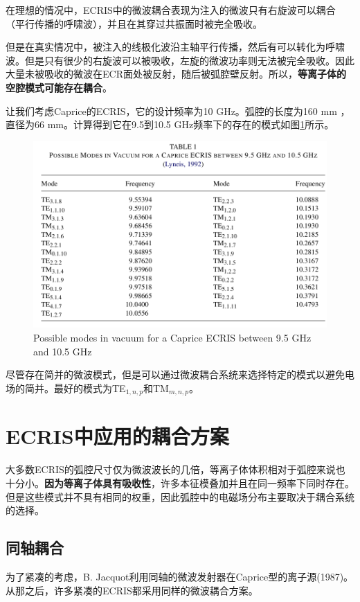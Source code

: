 \documentclass[fontset=windows]{article}
\begin{document}
在理想的情况中，ECRIS中的微波耦合表现为注入的微波只有右旋波可以耦合（平行传播的呼啸波），并且在其穿过共振面时被完全吸收。

但是在真实情况中，被注入的线极化波沿主轴平行传播，然后有可以转化为呼啸波。但是只有很少的右旋波可以被吸收，左旋的微波功率则无法被完全吸收。因此大量未被吸收的微波在ECR面处被反射，随后被弧腔壁反射。所以，\textbf{等离子体的空腔模式可能存在耦合}。

让我们考虑Caprice的ECRIS，它的设计频率为10 GHz。弧腔的长度为160 mm ，直径为66 mm。计算得到它在9.5到10.5 GHz频率下的存在的模式如图\ref{f-2}所示。
\begin{figure}
    \centering
    \includegraphics[width=1\textwidth]{possible modes.png}
    \caption{Possible modes in vacuum for a Caprice ECRIS between 9.5 GHz and 10.5 GHz}
    \label{f-2}
\end{figure}

尽管存在简并的微波模式，但是可以通过微波耦合系统来选择特定的模式以避免电场的简并。最好的模式为TE$_{1,n,p}$和TM$_{m,n,p}$。

\section{ECRIS中应用的耦合方案}
大多数ECRIS的弧腔尺寸仅为微波波长的几倍，等离子体体积相对于弧腔来说也十分小。\textbf{因为等离子体具有吸收性}，许多本征模叠加并且在同一频率下同时存在。但是这些模式并不具有相同的权重，因此弧腔中的电磁场分布主要取决于耦合系统的选择。
\subsection{同轴耦合}
为了紧凑的考虑，B. Jacquot利用同轴的微波发射器在Caprice型的离子源(1987)。从那之后，许多紧凑的ECRIS都采用同样的微波耦合方案。
\end{document}
